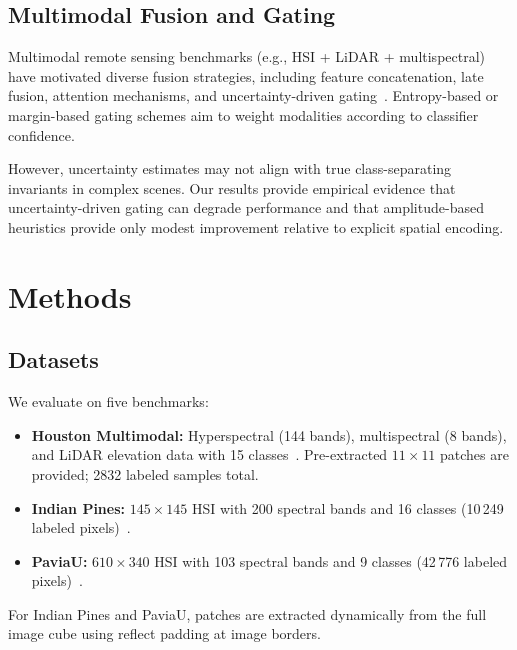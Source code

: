 \documentclass[journal]{IEEEtran}
\begin{document}
\subsection{Multimodal Fusion and Gating}

Multimodal remote sensing benchmarks (e.g., HSI + LiDAR +
multispectral) have motivated diverse fusion strategies, including
feature concatenation, late fusion, attention mechanisms, and
uncertainty-driven gating~\cite{khodadadzadeh2015_hsi_lidar_fusion,hong2021_more_diverse_means_better}.
Entropy-based or margin-based gating schemes aim to weight modalities
according to classifier confidence.

However, uncertainty estimates may not align with true
class-separating invariants in complex scenes. Our results provide
empirical evidence that uncertainty-driven gating can degrade
performance and that amplitude-based heuristics provide only modest
improvement relative to explicit spatial encoding.

\section{Methods}
\label{sec:methods}

\subsection{Datasets}

We evaluate on five benchmarks:

\begin{itemize}
  \item \textbf{Houston Multimodal:} Hyperspectral (144 bands),
    multispectral (8 bands), and LiDAR elevation data with 15
    classes~\cite{debes2014_grss_dfc2013}. Pre-extracted $11{\times}11$
    patches are provided; 2832 labeled samples total.
  \item \textbf{Indian Pines:} $145{\times}145$ HSI with 200 spectral
    bands and 16 classes (10\,249 labeled pixels)~\cite{baumgardner2015_indian_pines}.
  \item \textbf{PaviaU:} $610{\times}340$ HSI with 103 spectral bands
    and 9 classes (42\,776 labeled pixels)~\cite{fauvel2013_spectral_spatial_advances}.
\end{itemize}

For Indian Pines and PaviaU, patches are extracted dynamically from
the full image cube using reflect padding at image borders.
\end{document}
